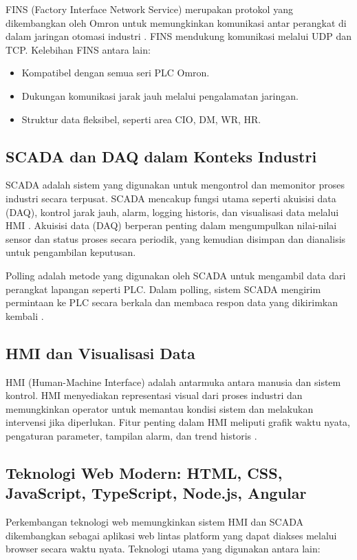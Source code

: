 FINS (Factory Interface Network Service) merupakan protokol yang dikembangkan oleh Omron untuk memungkinkan komunikasi antar perangkat di dalam jaringan otomasi industri \parencite{humaj2021fins}. FINS mendukung komunikasi melalui UDP dan TCP. Kelebihan FINS antara lain:
\begin{itemize}
    \item Kompatibel dengan semua seri PLC Omron.
    \item Dukungan komunikasi jarak jauh melalui pengalamatan jaringan.
    \item Struktur data fleksibel, seperti area CIO, DM, WR, HR.
\end{itemize}

\subsection{SCADA dan DAQ dalam Konteks Industri}
SCADA adalah sistem yang digunakan untuk mengontrol dan memonitor proses industri secara terpusat. SCADA mencakup fungsi utama seperti akuisisi data (DAQ), kontrol jarak jauh, alarm, logging historis, dan visualisasi data melalui HMI \parencite{uddin2022open}. Akuisisi data (DAQ) berperan penting dalam mengumpulkan nilai-nilai sensor dan status proses secara periodik, yang kemudian disimpan dan dianalisis untuk pengambilan keputusan.

Polling adalah metode yang digunakan oleh SCADA untuk mengambil data dari perangkat lapangan seperti PLC. Dalam polling, sistem SCADA mengirim permintaan ke PLC secara berkala dan membaca respon data yang dikirimkan kembali \parencite{omidi2023node}.

\subsection{HMI dan Visualisasi Data}
HMI (Human-Machine Interface) adalah antarmuka antara manusia dan sistem kontrol. HMI menyediakan representasi visual dari proses industri dan memungkinkan operator untuk memantau kondisi sistem dan melakukan intervensi jika diperlukan. Fitur penting dalam HMI meliputi grafik waktu nyata, pengaturan parameter, tampilan alarm, dan trend historis \parencite{seeed2024fuxa}.

\subsection{Teknologi Web Modern: HTML, CSS, JavaScript, TypeScript, Node.js, Angular}
Perkembangan teknologi web memungkinkan sistem HMI dan SCADA dikembangkan sebagai aplikasi web lintas platform yang dapat diakses melalui browser secara waktu nyata. Teknologi utama yang digunakan antara lain:

